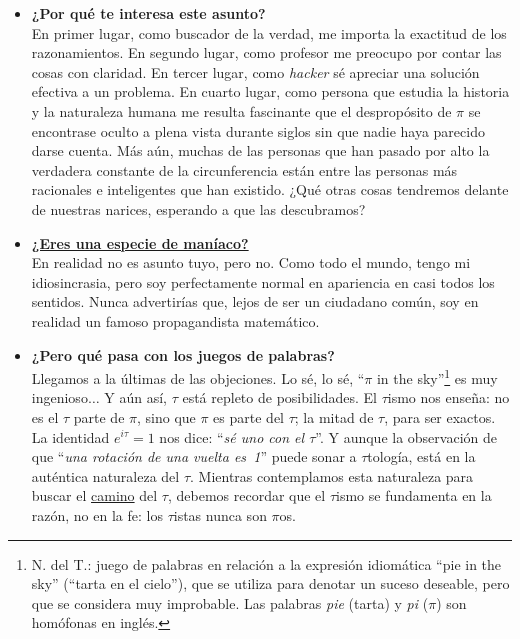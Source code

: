 \begin{itemize}
  \item \textbf{¿Por qué te interesa este asunto?} \\ En primer lugar, como buscador de la verdad, me importa la exactitud de los razonamientos. En segundo lugar, como profesor me preocupo por contar las cosas con claridad. En tercer lugar, como \emph{hacker} sé apreciar una solución efectiva a un problema. En cuarto lugar, como persona que estudia la historia y la naturaleza humana me resulta fascinante que el despropósito de $\pi$ se encontrase oculto a plena vista durante siglos sin que nadie haya parecido darse cuenta. Más aún, muchas de las personas que han pasado por alto la verdadera constante de la circunferencia están entre las personas más racionales e inteligentes que han existido. ¿Qué otras cosas tendremos delante de nuestras narices, esperando a que las descubramos?

  \item \href{https://youtube.com/clip/UgkxgkaP4J9lCZ8Yjd7Fe9iLGDHYfd9anfR1}{\textbf{¿Eres una especie de maníaco?}} \\ En realidad no es asunto tuyo, pero no. Como todo el mundo, tengo mi idiosincrasia, pero soy perfectamente normal en apariencia en casi todos los sentidos. Nunca advertirías que, lejos de ser un ciudadano común, soy en realidad un famoso propagandista matemático.


  \item \textbf{¿Pero qué pasa con los juegos de palabras?} \\ Llegamos a la últimas de las objeciones. Lo sé, lo sé, ``$\pi$ in the sky''\footnote{N. del T.: juego de palabras en relación a la expresión idiomática ``pie in the sky'' (``tarta en el cielo''), que se utiliza para denotar un suceso deseable, pero que se considera muy improbable. Las palabras \emph{pie} (tarta) y \emph{pi} ($\pi$) son homófonas en inglés.} es muy ingenioso$\ldots$ Y aún así, $\tau$ está repleto de posibilidades. El $\tau$ismo nos enseña: no es el $\tau$ parte de $\pi$, sino que $\pi$ es parte del $\tau$; la mitad de $\tau$, para ser exactos. La identidad $e^{i\tau} = 1$ nos dice: ``\emph{sé uno con el $\tau$}''. Y aunque la observación de que ``\emph{una rotación de una vuelta es~1}'' puede sonar a $\tau$tología, está en la auténtica naturaleza del $\tau$. Mientras contemplamos esta naturaleza para buscar el \href{https://es.wikipedia.org/wiki/Tao}{camino} del $\tau$, debemos recordar que el $\tau$ismo se fundamenta en la razón, no en la fe: los $\tau$istas nunca son $\pi$os.


\end{itemize}

